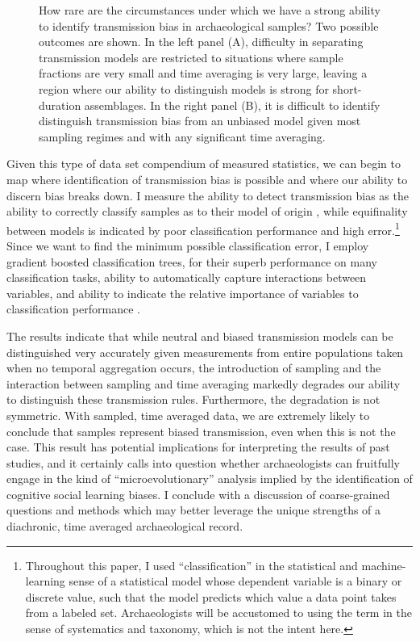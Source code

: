 \documentclass[10pt,letterpaper]{article}
\begin{document}
\begin{figure}[h]
\caption{How rare are the circumstances under which we have a strong ability to identify transmission bias in archaeological samples?  Two possible outcomes are shown.  In the left panel (A), difficulty in separating transmission models are restricted to situations where sample fractions are very small and time averaging is very large, leaving a region where our ability to distinguish models is strong for short-duration assemblages.  In the right panel (B), it is difficult to identify distinguish transmission bias from an unbiased model given most sampling regimes and with any significant time averaging.}
\label{fig1}
\end{figure}


Given this type of data set compendium of measured statistics, we can begin to map where identification of transmission bias is possible and where our ability to discern bias breaks down.  I measure the ability to detect transmission bias as the ability to correctly classify samples as to their model of origin \cite{devijver1982pattern, fukunaga1990introduction, hastie2009elements}, while equifinality between models is indicated by poor classification performance and high error.\footnote{Throughout this paper, I used ``classification'' in the statistical and machine-learning sense of a statistical model whose dependent variable is a binary or discrete value, such that the model predicts which value a data point takes from a labeled set.  Archaeologists will be accustomed to using the term in the sense of systematics and taxonomy, which is not the intent here.}  Since we want to find the minimum possible classification error, I employ gradient boosted classification trees, for their superb performance on many classification tasks, ability to automatically capture interactions between variables, and ability to indicate the relative importance of variables to classification performance \cite{AlexeyNatekin:2013ew,hastie2009elements}. 

The results indicate that while neutral and biased transmission models
can be distinguished very accurately given measurements from entire
populations taken when no temporal aggregation occurs, the introduction of
sampling and the interaction between sampling and time averaging markedly degrades our ability to distinguish these transmission
rules. Furthermore, the degradation is not symmetric. With sampled, time
averaged data, we are extremely likely to conclude that samples
represent biased transmission, even when this is not the case.  This result has potential implications for interpreting the results of past studies, and it certainly calls into question whether archaeologists can fruitfully engage in the kind of ``microevolutionary'' analysis implied by the identification of cognitive social learning biases.  I conclude with a discussion of coarse-grained questions and methods which may better leverage the unique strengths of a diachronic, time averaged archaeological record.
\end{document}
